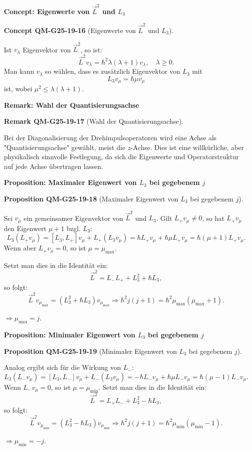 \documentclass[10pt, letterpaper]{article}
\newcommand{\CustomHeading}[3]{%
  \par\medskip\noindent%
  \textbf{#1 #2} \textnormal{(#3)}.\enskip%
}
\newenvironment{PROP}[2]{\begin{unitbox}\CustomHeading{Proposition}{#1}{#2}}{\end{unitbox}}
\newenvironment{REM}[2]{\begin{unitbox}\CustomHeading{Remark}{#1}{#2}}{\end{unitbox}}
\newenvironment{CONC}[2]{\begin{unitbox}\CustomHeading{Concept}{#1}{#2}}{\end{unitbox}}
\begin{document}
\textbf{Concept: Eigenwerte von \(\vec{L}^2\) und \(L_3\)}  

\begin{CONC}{QM-G25-19-16}{Eigenwerte von \(\vec{L}^2\) und \(L_3\)}
Ist \(v_\lambda\) Eigenvektor von \(\vec{L}^2\), so ist:
$$
\vec{L}^2 v_\lambda = \hbar^2 \lambda(\lambda + 1) v_\lambda, \quad \lambda \geq 0.
$$
Man kann \(v_\lambda\) so wählen, dass es zusätzlich Eigenvektor von \(L_3\) mit
$$
L_3 v_\mu = \hbar \mu v_\mu
$$
ist, wobei \(\mu^2 \leq \lambda(\lambda + 1)\).
\end{CONC}


\textbf{Remark: Wahl der Quantisierungsachse}  

\begin{REM}{QM-G25-19-17}{Wahl der Quantisierungsachse}
Bei der Diagonalisierung der Drehimpulsoperatoren wird eine Achse als "Quantisierungsachse" gewählt, meist die \(z\)-Achse. Dies ist eine willkürliche, aber physikalisch sinnvolle Festlegung, da sich die Eigenwerte und Operatorstruktur auf jede Achse übertragen lassen.
\end{REM}


\textbf{Proposition: Maximaler Eigenwert von \(L_3\) bei gegebenem \(j\)}

\begin{PROP}{QM-G25-19-18}{Maximaler Eigenwert von \(L_3\) bei gegebenem \(j\)}
Sei \(v_\mu\) ein gemeinsamer Eigenvektor von \(\vec{L}^2\) und \(L_3\). Gilt \(L_+ v_\mu \neq 0\), so hat \(L_+ v_\mu\) den Eigenwert \(\mu + 1\) bzgl. \(L_3\):
$$
L_3 (L_+ v_\mu) = [L_3, L_+] v_\mu + L_+ (L_3 v_\mu)
= \hbar L_+ v_\mu + \hbar \mu L_+ v_\mu = \hbar (\mu + 1) L_+ v_\mu.
$$
Wenn aber \(L_+ v_\mu = 0\), so ist \(\mu = \mu_{\max}\).

Setzt man dies in die Identität ein:
$$
\vec{L}^2 = L_- L_+ + L_3^2 + \hbar L_3,
$$
so folgt:
$$
\vec{L}^2 v_{\mu_{\max}} = \left(L_3^2 + \hbar L_3\right) v_{\mu_{\max}}
\Rightarrow \hbar^2 j(j+1) = \hbar^2 \mu_{\max} (\mu_{\max} + 1).
$$

\(\Rightarrow \mu_{\max} = j\).
\end{PROP}



\textbf{Proposition: Minimaler Eigenwert von \(L_3\) bei gegebenem \(j\)}

\begin{PROP}{QM-G25-19-19}{Minimaler Eigenwert von \(L_3\) bei gegebenem \(j\)}
Analog ergibt sich für die Wirkung von \(L_-\):
$$
L_3 (L_- v_\mu) = [L_3, L_-] v_\mu + L_- (L_3 v_\mu)
= -\hbar L_- v_\mu + \hbar \mu L_- v_\mu = \hbar (\mu - 1) L_- v_\mu.
$$
Wenn \(L_- v_\mu = 0\), so ist \(\mu = \mu_{\min}\). Setzt man dies in die Identität ein:
$$
\vec{L}^2 = L_+ L_- + L_3^2 - \hbar L_3,
$$
so folgt:
$$
\vec{L}^2 v_{\mu_{\min}} = \left(L_3^2 - \hbar L_3\right) v_{\mu_{\min}}
\Rightarrow \hbar^2 j(j+1) = \hbar^2 \mu_{\min} (\mu_{\min} - 1).
$$

\(\Rightarrow \mu_{\min} = -j\).
\end{PROP}
\end{document}
